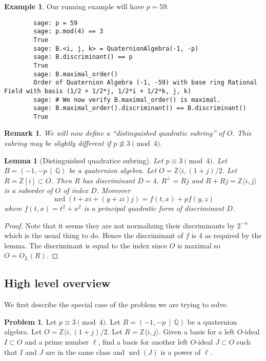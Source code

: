 \documentclass[10pt]{article}
\theoremstyle{plain}
\newtheorem{lemma}[theorem]{Lemma}
\newtheorem{remark}[theorem]{Remark}
\theoremstyle{definition}
\newtheorem{example}[theorem]{Example}
\newtheorem{problem}[theorem]{Problem}
\newcommand{\op}{\operatorname}
\newcommand{\Z}{\mathbb{Z}}
\newcommand{\Q}{\mathbb{Q}}
\newcommand{\nrd}{\op{nrd}}
\begin{document}
\begin{example}
    Our running example will have \( p = 59 \).
    \begin{lstlisting}
        sage: p = 59
        sage: p.mod(4) == 3
        True 
        sage: B.<i, j, k> = QuaternionAlgebra(-1, -p)
        sage: B.discriminant() == p
        True
        sage: B.maximal_order()
        Order of Quaternion Algebra (-1, -59) with base ring Rational Field with basis (1/2 + 1/2*j, 1/2*i + 1/2*k, j, k)
        sage: # We now verify B.maximal_order() is maximal.
        sage: B.maximal_order().discriminant() == B.discriminant()
        True
    \end{lstlisting}
\end{example}

\begin{remark}
    We will now define a ``distinguished quadratic subring'' of \( O \).
    This subring may be slightly different if \( p \not\equiv 3 \pmod{4} \).
\end{remark}

\begin{lemma}[Distinguished quadratice subring]
    Let \( p \equiv 3 \pmod{4} \).
    Let \( B =  (-1, -p \, \mid \, \Q) \) be a quaternion algebra.
    Let \( O = \Z \langle i, (1+j) / 2 \).
    Let \( R = \Z[i] \subset O \).
    Then \( R \) has discriminant \( D = 4 \), \( R^\perp = Rj \) and \( R + Rj = \Z\langle i, j \rangle\) is a suborder of \( O \) of index \( D \).
    Moreover
    \[
        \nrd(t + xi + (y + zi)j) = f(t, x) + p f(y, z)
    \]
    where \( f(t, x) = t^2 + x^2 \) is a principal quadratic form of discriminant \( D \).
\end{lemma}
\begin{proof}
    Note that it seems they are not normalizing their discriminants by \( 2^{-n} \) which is the usual thing to do.
    Hence the discriminant of \( f \) is 4 as required by the lemma.
    The discriminant is equal to the index since \( O \) is maximal so \( O = O_L(R) \).
\end{proof}

\subsection{High level overview}

We first describe the special case of the problem we are trying to solve.
\begin{problem}
Let \( p \equiv 3 \pmod{4} \).
Let \( B =  (-1, -p \, \mid \, \Q) \) be a quaternion algebra.
Let \( O = \Z \langle i, (1+j) / 2 \).
Let \( R = \Z \langle i , j \rangle \).
Given a basis for a left \( O \)-ideal \( I \subset O \) and a prime number \( \ell \), find a basis for another left \( O \)-ideal \( J \subset O \) such that \( I \) and \( J \) are in the same class and \( \nrd(J) \) is a power of \( \ell \).
\end{problem}
\end{document}
